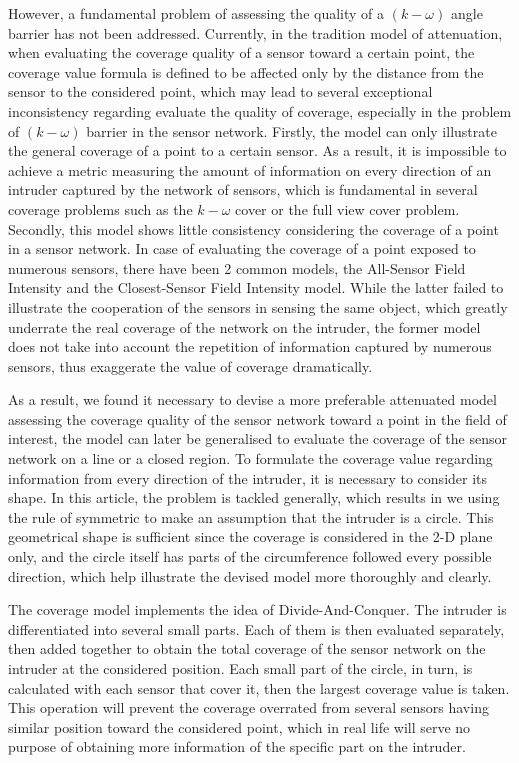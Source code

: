\documentclass[3p]{elsarticle}
\begin{document}
However, a fundamental problem of assessing the quality of a $(k-\omega)$ angle barrier has not been addressed. Currently, in the tradition model of attenuation, when evaluating the coverage quality of a sensor toward a certain point, the coverage value formula is defined to be affected only by the distance from the sensor to the considered point, which may lead to several exceptional inconsistency regarding evaluate the quality of coverage, especially in the problem of $(k-\omega)$ barrier in the sensor network. Firstly, the model can only illustrate the general coverage of a point to a certain sensor. As a result, it is impossible to achieve a metric measuring the amount of information on every direction of an intruder captured by the network of sensors, which is fundamental in several coverage problems such as the $k-\omega$ cover or the full view cover problem. Secondly, this model shows little consistency considering the coverage of a point in a sensor network. In case of evaluating the coverage of a point exposed to numerous sensors, there have been 2 common models, the All-Sensor Field Intensity and the Closest-Sensor Field Intensity model. While the latter failed to illustrate the cooperation of the sensors in sensing the same object, which greatly underrate the real coverage of the network on the intruder, the former model does not take into account the repetition of information captured by numerous sensors, thus exaggerate the value of coverage dramatically.\par
%
As a result, we found it necessary to devise a more preferable attenuated model assessing the coverage quality of the sensor network toward a point in the field of interest, the model can later be generalised to evaluate the coverage of the sensor network on a line or a closed region. To formulate the coverage value regarding information from every direction of the intruder, it is necessary to consider its shape. In this article, the problem is tackled generally, which results in we using the rule of symmetric to make an assumption that the intruder is a circle. This geometrical shape is sufficient since the coverage is considered in the 2-D plane only, and the circle itself has parts of the circumference followed every possible direction, which help illustrate the devised model more thoroughly and clearly.\par
%
The coverage model implements the idea of Divide-And-Conquer. The intruder is differentiated into several small parts. Each of them is then evaluated separately, then added together to obtain the total coverage of the sensor network on the intruder at the considered position. Each small part of the circle, in turn, is calculated with each sensor that cover it, then the largest coverage value is taken. This operation will prevent the coverage overrated from several sensors having similar position toward the considered point, which in real life will serve no purpose of obtaining more information of the specific part on the intruder. 
\end{document}
